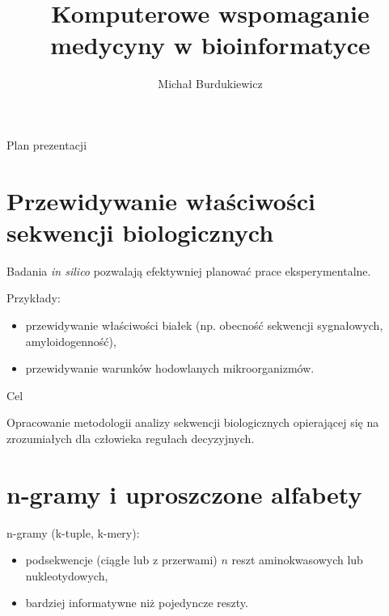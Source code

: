 \documentclass{beamer}\usepackage[]{graphicx}\usepackage[]{color}
\title{Komputerowe wspomaganie medycyny w bioinformatyce}
\date{}
\author{Michał Burdukiewicz}
\institute{Zakład Projektowania Systemów CAD/CAM i Komputerowego Wspomagania Medycyny}
\begin{document}
  

\maketitle

\begin{frame}{Plan prezentacji}

\tableofcontents

\end{frame} 

\section{Przewidywanie właściwości sekwencji biologicznych}

\begin{frame}{} 

Badania \textit{in silico} pozwalają efektywniej planować prace eksperymentalne.

Przykłady: 

\begin{itemize}
\item przewidywanie właściwości białek (np. obecność sekwencji sygnałowych, amyloidogenność),  
\item przewidywanie warunków hodowlanych mikroorganizmów.
\end{itemize}

\end{frame}   
  
\begin{frame}{Cel} 

Opracowanie metodologii analizy sekwencji biologicznych opierającej się na zrozumiałych dla człowieka regułach decyzyjnych. 

\end{frame}   

\section{n-gramy i uproszczone alfabety}

\begin{frame}
n-gramy (k-tuple, k-mery):
\begin{itemize}
\item podsekwencje (ciągłe lub z przerwami) $n$ reszt aminokwasowych lub nukleotydowych,
\item bardziej informatywne niż pojedyncze reszty.
\end{itemize}
\end{frame}  
\end{document}
